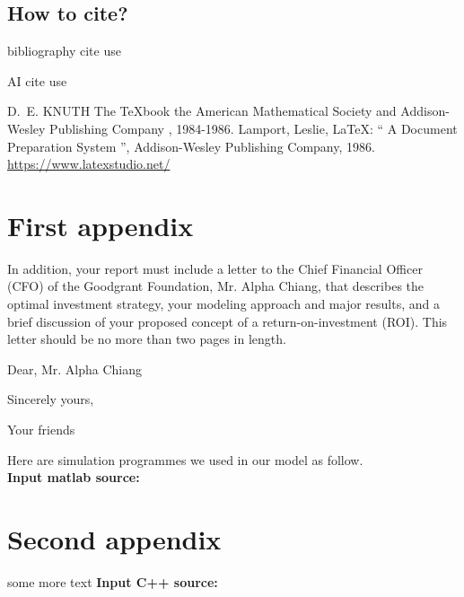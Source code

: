 \documentclass{mcmthesis}
\begin{document}
\subsection{How to cite?}
bibliography cite use \cite{1,2,3}

AI cite use 

\begin{thebibliography}{99}
 D.~E. KNUTH   The \TeX{}book  the American
Mathematical Society and Addison-Wesley
Publishing Company , 1984-1986.
Lamport, Leslie,  \LaTeX{}: `` A Document Preparation System '',
Addison-Wesley Publishing Company, 1986.
\url{https://www.latexstudio.net/}
\end{thebibliography}

\begin{appendices}

\section{First appendix}

In addition, your report must include a letter to the Chief Financial Officer (CFO) of the Goodgrant Foundation, Mr. Alpha Chiang, that describes the optimal investment strategy, your modeling approach and major results, and a brief discussion of your proposed concept of a return-on-investment (ROI). This letter should be no more than two pages in length.

\begin{letter}{Dear, Mr. Alpha Chiang}

\lipsum[1-2]

\vspace{\parskip}

Sincerely yours,

Your friends

\end{letter}
Here are simulation programmes we used in our model as follow.\\

\textbf{\textcolor[rgb]{0.98,0.00,0.00}{Input matlab source:}}


\section{Second appendix}

some more text \textcolor[rgb]{0.98,0.00,0.00}{\textbf{Input C++ source:}}


\end{appendices}
\end{document}
